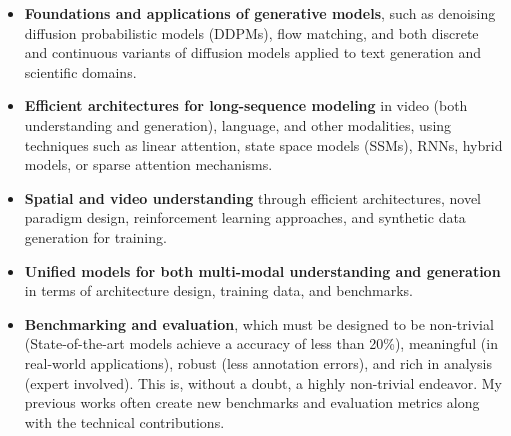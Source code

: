 \documentclass[a4paper,11pt]{article}
\newcommand{\sepspace}{\vspace{6pt}}
\begin{document}
\begin{itemize}
    \item[$\circ$] \textbf{Foundations and applications of generative models}, such as denoising diffusion probabilistic models (DDPMs), flow matching, and both discrete and continuous variants of diffusion models applied to text generation and scientific domains.
    \item[$\circ$] \textbf{Efficient architectures for long-sequence modeling} in video (both understanding and generation), language, and other modalities, using techniques such as linear attention, state space models (SSMs), RNNs, hybrid models, or sparse attention mechanisms. 
    \item[$\circ$] \textbf{Spatial and video understanding} through efficient architectures, novel paradigm design, reinforcement learning approaches, and synthetic data generation for training. 
    \item[$\circ$] \textbf{Unified models for both multi-modal understanding and generation} in terms of architecture design, training data, and benchmarks.
    \item[$\circ$] \textbf{Benchmarking and evaluation}, which must be designed to be non-trivial (State-of-the-art models achieve a accuracy of less than 20\%), meaningful (in real-world applications), robust (less annotation errors), and rich in analysis (expert involved). This is, without a doubt, a highly non-trivial endeavor. My previous works often create new benchmarks and evaluation metrics along with the technical contributions.
\end{itemize}

\end{document}
